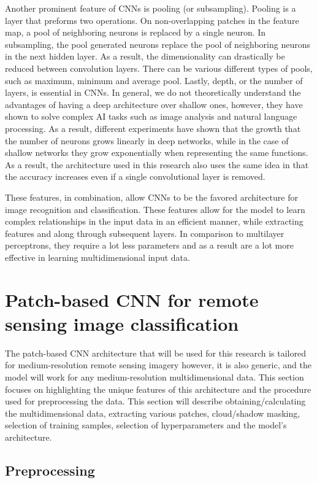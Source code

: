 \documentclass[letterpaper, 10 pt, conference]{ieeeconf}  %
\begin{document}
Another prominent feature of CNNs is pooling (or subsampling). Pooling is a layer that preforms two operations. On non-overlapping patches in the feature map, a pool of neighboring neurons is replaced by a single neuron. In subsampling, the pool generated neurons replace the pool of neighboring neurons in the next hidden layer. As a result, the dimensionality can drastically be reduced between convolution layers. There can be various different types of pools, such as maximum, minimum and average pool.
Lastly, depth, or the number of layers, is essential in CNNs. In general, we do not theoretically understand the advantages of having a deep architecture over shallow ones, however, they have shown to solve complex AI tasks such as image analysis and natural language processing. As a result, different experiments have shown that the growth that the number of neurons grows linearly in deep networks, while in the case of shallow networks they grow exponentially when representing the same functions. As a result, the architecture used in this research also uses the same idea in that the accuracy increases even if a single convolutional layer is removed.

These features, in combination, allow CNNs to be the favored architecture for image recognition and classification. These features allow for the model to learn complex relationships in the input data in an efficient manner, while extracting features and along through subsequent layers. In comparison to multilayer perceptrons, they require a lot less parameters and as a result are a lot more effective in learning multidimensional input data.

\section{Patch-based CNN for remote sensing image classification}


The patch-based CNN architecture that will be used for this research is tailored for medium-resolution remote sensing imagery however, it is also generic, and the model will work for any medium-resolution multidimensional data. This section focuses on highlighting the unique features of this architecture and the procedure used for preprocessing the data. This section will describe obtaining/calculating the multidimensional data, extracting various patches, cloud/shadow masking, selection of training samples, selection of hyperparameters and the model’s architecture.

\subsection{Preprocessing}
\end{document}
